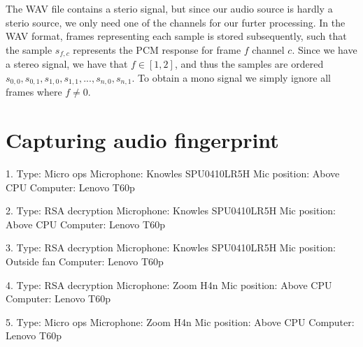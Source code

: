 The WAV file contains a sterio signal, but since our audio source is hardly a sterio source, we only need one of the channels for our furter processing.  
In the WAV format, frames representing each sample is stored subsequently, such that the sample \( s_{f,c} \) represents the PCM  response for frame \( f \) channel \( c \). 
Since we have a stereo signal, we have that \( f \in \left [ 1, 2 \right ]  \), and thus the samples are ordered  \( s_{0,0}, s_{0,1}, s_{1,0}, s_{1,1}, ... , s_{n,0}, s_{n,1} \). 
To obtain a mono signal we simply ignore all frames where \( f \neq 0 \).

\section{Capturing audio fingerprint}\label{sec:ch3_capturing_audio_fingerprint}

1. 
Type: Micro ops
Microphone: Knowles SPU0410LR5H
Mic position: Above CPU
Computer: Lenovo T60p

2. 
Type: RSA decryption
Microphone: Knowles SPU0410LR5H
Mic position: Above CPU
Computer: Lenovo T60p

3.
Type: RSA decryption
Microphone: Knowles SPU0410LR5H
Mic position: Outside fan
Computer: Lenovo T60p

4. 
Type: RSA decryption
Microphone: Zoom H4n
Mic position: Above CPU
Computer: Lenovo T60p

5. 
Type: Micro ops
Microphone: Zoom H4n
Mic position: Above CPU
Computer: Lenovo T60p
